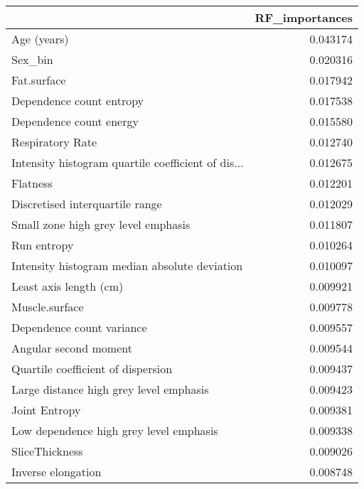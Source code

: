\centering
\begin{longtable}{|lr|}
\toprule
{} &  RF\_importances \\
\midrule
Age (years)                                        &        0.043174 \\
Sex\_bin                                            &        0.020316 \\
Fat.surface                                        &        0.017942 \\
Dependence count entropy                           &        0.017538 \\
Dependence count energy                            &        0.015580 \\
Respiratory Rate                                   &        0.012740 \\
Intensity histogram quartile coefficient of dis... &        0.012675 \\
Flatness                                           &        0.012201 \\
Discretised interquartile range                    &        0.012029 \\
Small zone high grey level emphasis                &        0.011807 \\
Run entropy                                        &        0.010264 \\
Intensity histogram median absolute deviation      &        0.010097 \\
Least axis length (cm)                             &        0.009921 \\
Muscle.surface                                     &        0.009778 \\
Dependence count variance                          &        0.009557 \\
Angular second moment                              &        0.009544 \\
Quartile coefficient of dispersion                 &        0.009437 \\
Large distance high grey level emphasis            &        0.009423 \\
Joint Entropy                                      &        0.009381 \\
Low dependence high grey level emphasis            &        0.009338 \\
SliceThickness                                     &        0.009026 \\
Inverse elongation                                 &        0.008748 \\

\end{longtable}
